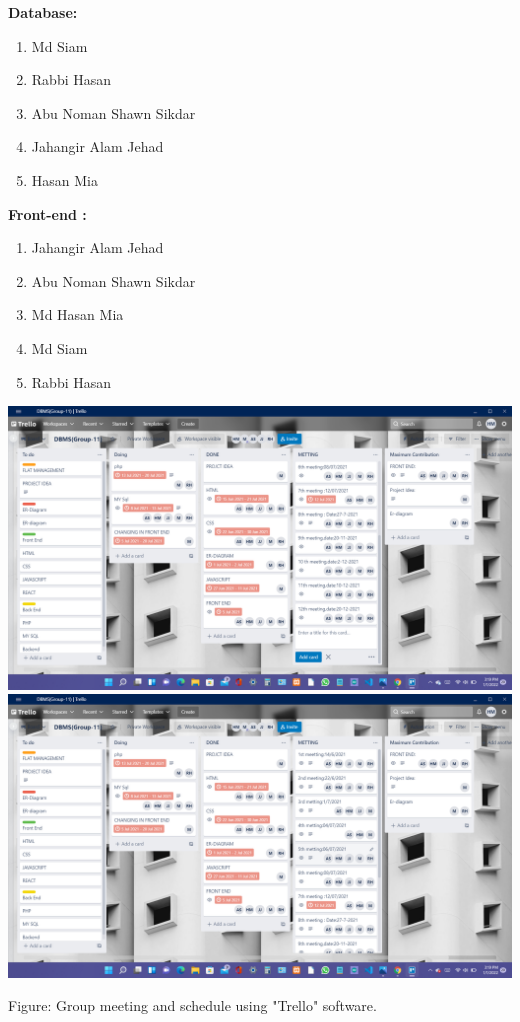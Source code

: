 \textbf{Database:}
\begin{enumerate}
    \item Md Siam
    \item Rabbi Hasan
    \item Abu Noman Shawn Sikdar
    \item Jahangir Alam Jehad
    \item Hasan Mia
\end{enumerate}
\textbf{Front-end :}
\begin{enumerate}
    \item Jahangir Alam Jehad
    \item Abu Noman Shawn Sikdar
    \item Md Hasan Mia
    \item Md Siam
    \item Rabbi Hasan\\
\end{enumerate}
\includegraphics[width=1\textwidth, inner]{trello1.png}
\includegraphics[width=1\textwidth, inner]{trello2.png}
\begin{center}
    Figure: Group meeting and schedule using "Trello" software.
\end{center}

\clejearpage